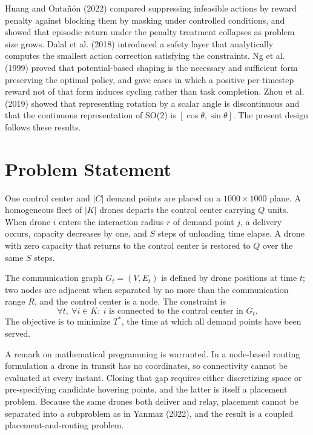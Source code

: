 \documentclass[12pt]{article}
\begin{document}
Huang and Ontañón (2022) compared suppressing infeasible actions by reward penalty against blocking
them by masking under controlled conditions, and showed that episodic return under the penalty
treatment collapses as problem size grows. Dalal et al. (2018) introduced a safety layer that
analytically computes the smallest action correction satisfying the constraints. Ng et al. (1999)
proved that potential-based shaping is the necessary and sufficient form preserving the optimal
policy, and gave cases in which a positive per-timestep reward not of that form induces cycling
rather than task completion. Zhou et al. (2019) showed that representing rotation by a scalar angle
is discontinuous and that the continuous representation of SO(2) is $[\cos\theta, \sin\theta]$.
The present design follows these results.

\section{Problem Statement}

One control center and $|C|$ demand points are placed on a $1000 \times 1000$ plane. A homogeneous
fleet of $|K|$ drones departs the control center carrying $Q$ units. When drone $i$ enters the
interaction radius $r$ of demand point $j$, a delivery occurs, capacity decreases by one, and $S$
steps of unloading time elapse. A drone with zero capacity that returns to the control center is
restored to $Q$ over the same $S$ steps.

The communication graph $G_t = (V, E_t)$ is defined by drone positions at time $t$; two nodes are
adjacent when separated by no more than the communication range $R$, and the control center is a
node. The constraint is
\begin{equation}
\forall t, \ \forall i \in K: \ i \text{ is connected to the control center in } G_t .
\end{equation}
The objective is to minimize $T^*$, the time at which all demand points have been served.

A remark on mathematical programming is warranted. In a node-based routing formulation a drone in
transit has no coordinates, so connectivity cannot be evaluated at every instant. Closing that gap
requires either discretizing space or pre-specifying candidate hovering points, and the latter is
itself a placement problem. Because the same drones both deliver and relay, placement cannot be
separated into a subproblem as in Yanmaz (2022), and the result is a coupled placement-and-routing
problem.
\end{document}
